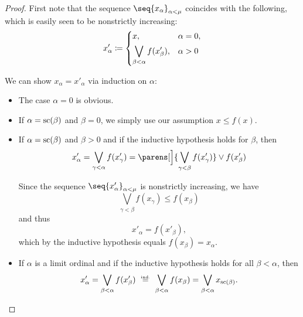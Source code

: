 \begin{proof}
   First note that the sequence \( \seq{ x_\alpha }_{\alpha < \mu} \) coincides with the following, which is easily seen to be nonstrictly increasing:
  \begin{equation*}
    x'_\alpha \coloneqq \begin{dcases}
      x,                                    &\alpha = 0, \\
      \bigvee_{\beta < \alpha} f(x'_\beta), &\alpha > 0 \\
    \end{dcases}
  \end{equation*}

   We can show \( x_\alpha = x'_\alpha \) via induction on \( \alpha \):
  \begin{itemize}
    \item The case \( \alpha = 0 \) is obvious.
    \item If \( \alpha = \op{sc}(\beta) \) and \( \beta = 0 \), we simply use our assumption \( x \leq f(x) \).
    \item If \( \alpha = \op{sc}(\beta) \) and \( \beta > 0 \) and if the inductive hypothesis holds for \( \beta \), then
    \begin{equation*}
      x'_\alpha
      =
      \bigvee_{\gamma < \alpha} f(x'_\gamma)
      =
      \parens[\Big]{ \bigvee_{\gamma < \beta} f(x'_\gamma) } \vee f(x'_\beta)
    \end{equation*}

    Since the sequence \( \seq{ x'_\alpha }_{\alpha < \mu} \) is nonstrictly increasing, we have
    \begin{equation*}
      \bigvee_{\gamma < \beta} f(x_\gamma) \leq f(x_\beta)
    \end{equation*}
    and thus
    \begin{equation*}
      x'_\alpha = f(x'_\beta),
    \end{equation*}
    which by the inductive hypothesis equals \( f(x_\beta) = x_\alpha \).

    \item If \( \alpha \) is a limit ordinal and if the inductive hypothesis holds for all \( \beta < \alpha \), then
    \begin{equation*}
      x'_\alpha
      =
      \bigvee_{\beta < \alpha} f(x'_\beta)
      \reloset {\T{ind.}} =
      \bigvee_{\beta < \alpha} f(x_\beta)
      =
      \bigvee_{\beta < \alpha} x_{\op{sc}(\beta)}.
    \end{equation*}


\end{itemize}
\end{proof}
